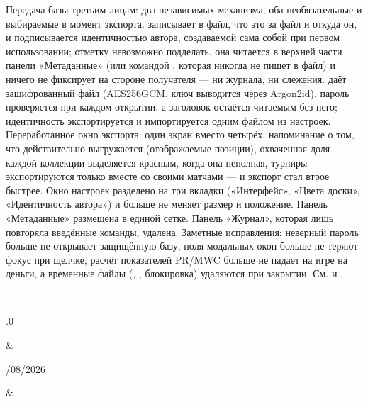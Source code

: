 \documentclass[letterpaper,10pt,russian]{sphinxmanual}
\begin{document}
\begin{savenotes}
\begin{longtable}{}
\begin{varwidth}[t]{}
Передача базы третьим лицам: два независимых механизма, оба необязательные и выбираемые в момент экспорта.  записывает в файл, что это за файл и откуда он, и подписывается идентичностью автора, создаваемой сама собой при первом использовании; отметку невозможно подделать, она читается в верхней части панели «Метаданные» (или командой , которая никогда не пишет в файл) и ничего не фиксирует на стороне получателя — ни журнала, ни слежения.  даёт зашифрованный файл  (AES\sphinxhyphen{}256\sphinxhyphen{}GCM, ключ выводится через Argon2id), пароль проверяется при каждом открытии, а заголовок остаётся читаемым без него; идентичность экспортируется и импортируется одним файлом из настроек. Переработанное окно экспорта: один экран вместо четырёх, напоминание о том, что действительно выгружается (отображаемые позиции), охваченная доля каждой коллекции выделяется красным, когда она неполная, турниры экспортируются только вместе со своими матчами — и экспорт стал втрое быстрее. Окно настроек разделено на три вкладки («Интерфейс», «Цвета доски», «Идентичность автора») и больше не меняет размер и положение. Панель «Метаданные» размещена в единой сетке. Панель «Журнал», которая лишь повторяла введённые команды, удалена. Заметные исправления: неверный пароль больше не открывает защищённую базу, поля модальных окон больше не теряют фокус при щелчке, расчёт показателей PR/MWC больше не падает на игре на деньги, а временные файлы (, , блокировка) удаляются при закрытии. См. {\hyperref[\detokenize{manuel:diffusion-controlee}]{}} и {\hyperref[\detokenize{manuel:manuel}]{}}.
\sphinxbeforeendvarwidth
\end{varwidth}%
\\
\sphinxhline\begin{varwidth}[t]{}
.0
\sphinxbeforeendvarwidth
\end{varwidth}%
&\begin{varwidth}[t]{}
/08/2026
\sphinxbeforeendvarwidth
\end{varwidth}%
&\begin{varwidth}[t]{}
\sphinxAtStartPar

\end{varwidth}
\end{longtable}
\end{savenotes}
\end{document}

